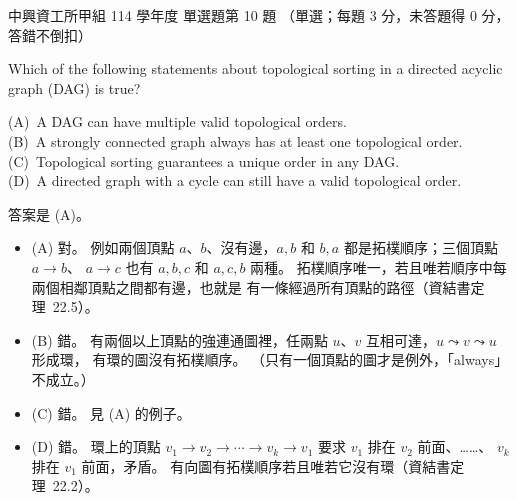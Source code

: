 \begin{pastexam}[label={px:nchu-114-dsa-10}]{中興資工所甲組 114 學年度 單選題第 10 題}
（單選；每題 3 分，未答題得 0 分，答錯不倒扣）

Which of the following statements about topological sorting in a directed acyclic graph (DAG) is true?

(A)~A DAG can have multiple valid topological orders.\\
(B)~A strongly connected graph always has at least one topological order.\\
(C)~Topological sorting guarantees a unique order in any DAG.\\
(D)~A directed graph with a cycle can still have a valid topological order.
\end{pastexam}

\begin{pastsoln}
答案是 (A)。

\begin{itemize}
\item (A) 對。 例如兩個頂點 $a$、$b$、沒有邊，$a, b$ 和 $b, a$ 都是拓樸順序；三個頂點 $a \to b$、
$a \to c$ 也有 $a, b, c$ 和 $a, c, b$ 兩種。 拓樸順序唯一，若且唯若順序中每兩個相鄰頂點之間都有邊，也就是
有一條經過所有頂點的路徑（資結書定理~22.5）。
\item (B) 錯。 有兩個以上頂點的強連通圖裡，任兩點 $u$、$v$ 互相可達，$u \leadsto v \leadsto u$ 形成環，
有環的圖沒有拓樸順序。 （只有一個頂點的圖才是例外，「always」不成立。）
\item (C) 錯。 見 (A) 的例子。
\item (D) 錯。 環上的頂點 $v_1 \to v_2 \to \cdots \to v_k \to v_1$ 要求 $v_1$ 排在 $v_2$ 前面、……、
$v_k$ 排在 $v_1$ 前面，矛盾。 有向圖有拓樸順序若且唯若它沒有環（資結書定理~22.2）。
\end{itemize}
\end{pastsoln}
